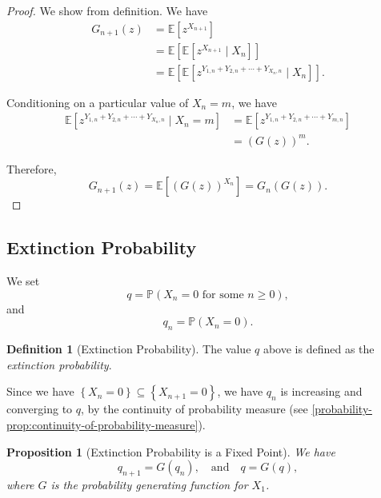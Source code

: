 \documentclass[11pt]{article}
\numberwithin{equation}{section}
\newtheorem{proposition}[theorem]{Proposition}
\theoremstyle{definition}
\newtheorem{definition}[theorem]{Definition}
\theoremstyle{remark}
\newcommand{\pqty}[1]{\left(#1\right)}
\newcommand{\bqty}[1]{\left[#1\right]}
\newcommand{\Bqty}[1]{\left\{#1\right\}}
\newcommand{\qand}{\quad\text{and}\quad}
\newcommand{\Prob}{\mathbb P}
\newcommand{\Expt}{\mathbb E}
\newcommand{\Conditional}[2]{#1\mid #2}
\begin{document}
\begin{proof}\label{probability-proof-048}
    We show from definition. We have
    \begin{align*}
        G_{n + 1} \pqty{z} &= \Expt\bqty{z^{X_{n + 1}}} \\
        &= \Expt\bqty{\Expt\bqty{\Conditional{z^{X_{n + 1}}}{X_n}}} \\
        &= \Expt\bqty{\Expt\bqty{\Conditional{z^{Y_{1, n} + Y_{2, n} + \cdots + Y_{X_n, n}}}{X_n}}}.
    \end{align*}

    Conditioning on a particular value of \(X_n = m\), we have
    \begin{align*}
        \Expt\bqty{\Conditional{z^{Y_{1, n} + Y_{2, n} + \cdots + Y_{X_n, n}}}{X_n = m}} &= \Expt\bqty{z^{Y_{1, n} + Y_{2, n} + \cdots + Y_{m, n}}} \\
        &= \pqty{G\pqty{z}}^{m}.
    \end{align*}

    Therefore,
    \[
        G_{n + 1} \pqty{z} = \Expt\bqty{\pqty{G\pqty{z}}^{X_n}} = G_n \pqty{G\pqty{z}}.
    \]
\end{proof}

\subsection{Extinction Probability}

We set
\[
    q = \Prob\pqty{X_n = 0 \text{ for some } n \geq 0},
\]
and
\[
    q_n = \Prob\pqty{X_n = 0}.
\]

\begin{definition}[Extinction Probability]\label{probability-definition-042}
    \label{probability-def:exctinction-probability}%
    The value \(q\) above is defined as the \emph{extinction probability}.
\end{definition}

Since we have \(\Bqty{X_n = 0} \subseteq \Bqty{X_{n + 1} = 0}\), we have \(q_n\) is increasing and converging to \(q\), by the continuity of probability measure (see \autoref{probability-prop:continuity-of-probability-measure}).

\begin{proposition}[Extinction Probability is a Fixed Point]\label{probability-proposition-026}
    We have
    \[
        q_{n + 1} = G\pqty{q_n}, \qand q = G\pqty{q},
    \]
    where \(G\) is the probability generating function for \(X_1\).
\end{proposition}
\end{document}
